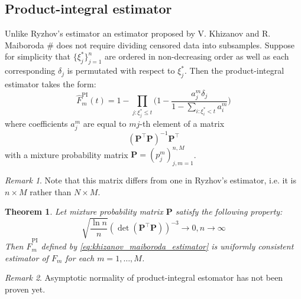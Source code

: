 \documentclass[12pt,reqno,a4paper,oneside]{article}
\theoremstyle{plain}
\newtheorem{thm}{Theorem}[section]
\theoremstyle{definition}
\theoremstyle{remark}
\newtheorem*{rem}{Remark}
\begin{document}
\subsection{Product-integral estimator}
Unlike Ryzhov's estimator an estimator proposed by V. Khizanov and R. Maiboroda $\#$ does not require dividing censored data into subsamples. Suppose for simplicity that $\{\xi ^* _j\}_{j=1}^n$ are ordered in non-decreasing order as well as each corresponding $\delta_j$ is permutated with respect to $\xi ^*_j$. Then the product-integral estimator takes the form:
\begin{equation}
\label{eq:khizanov_maiboroda_estimator}
\hat F^{\mathrm{PI}}_m(t) = 1 - \prod _{j : \xi ^*_j \leq t}\bigg( 1 - \frac {a_j^m \delta _j}{1 - \sum _{i:\xi ^*_i < t} a_i^m} \bigg)
\end{equation}
where coefficients $a_j^m$ are equal to $mj$-th element of a matrix
\begin{equation}
(\mathbf P^\top \mathbf P)^{-1}\mathbf P^\top
\end{equation}
with a mixture probability matrix $\mathbf P=(p_{j}^m)_{j,m=1}^{n, M}$.
\begin{rem}
	Note that this matrix differs from one in Ryzhov's estimator, i.e. it is $n\times M$ rather than $N\times M$.
\end{rem}
\begin{thm}
Let mixture probability matrix $\mathbf P$ satisfy the following property: 
\begin{equation*}
\sqrt{\frac{\ln n}{n}}(\det (\mathbf P^\top \mathbf P))^{-3} \to 0, n \to \infty
\end{equation*}
Then $\hat F^{\mathrm{PI}}_m$ defined by \eqref{eq:khizanov_maiboroda_estimator} is uniformly consistent estimator of $F_m$ for each $m=1,\ldots, M$.
\end{thm}
\begin{rem}
Asymptotic normality of product-integral estomator has not been proven yet.
\end{rem}
\end{document}
